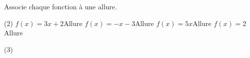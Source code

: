 %
%
    Associe chaque fonction à une allure.
    \begin{tasks}(2)
        \task $f(x) = 3x+2$\quad Allure \blank[width=1cm]{}
        \task $f(x) = -x - 3$\quad Allure \blank[width=1cm]{}
        \task $f(x) = 5x$\quad Allure \blank[width=1cm]{}
        \task $f(x) = 2$\quad Allure \blank[width=1cm]{}
    \end{tasks}
    \vfil
    \begin{tasks}[label=\fbox{\arabic*}, label-width=15pt](3)
        \task 
        \task 
        \task 
        \task 
        \task 
        \task 
    \end{tasks}
